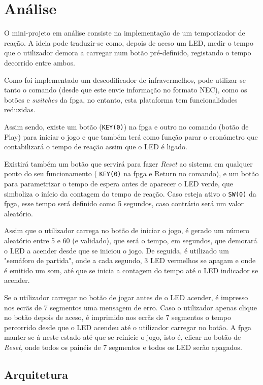 \documentclass[a4paper,11pt,onecolumn]{report}
\begin{document}
\chapter{Análise}
\label{chap.analise}
O mini-projeto em análise consiste na implementação de um temporizador de reação. A ideia pode traduzir-se como, depois de aceso um LED, medir o tempo que o utilizador demora a carregar num botão pré-definido, registando o tempo decorrido entre ambos. 

Como foi implementado um descodificador de infravermelhos, pode utilizar-se tanto o comando (desde que este envie informação no formato NEC), como os botões e \textit{switches} da \ac{fpga}, no entanto, esta plataforma tem funcionalidades reduzidas.

Assim sendo, existe um botão (\texttt{KEY(0)}) na \ac{fpga} e outro no comando (botão de Play) para iniciar o jogo e que também terá como função parar o cronómetro que contabilizará o tempo de reação assim que o LED é ligado.

Existirá também um botão que servirá para fazer \textit{Reset} ao sistema em qualquer ponto do seu funcionamento ( \texttt{KEY(0)} na \ac{fpga} e Return no comando), e um botão para parametrizar o tempo de espera antes de aparecer o LED verde, que simboliza o início da contagem do tempo de reação. Caso esteja ativo o \texttt{SW(0)} da \ac{fpga}, esse tempo será definido como 5 segundos, caso contrário será um valor aleatório.

Assim que o utilizador carrega no botão de iniciar o jogo, é gerado um número aleatório entre 5 e 60 (e validado), que será o tempo, em segundos, que demorará o LED a acender desde que se iniciou o jogo. De seguida, é utilizado um "semáforo de partida", onde a cada segundo, 3 LED vermelhos se apagam e onde é emitido um som, até que se inicia a contagem do tempo até o LED indicador se acender.

Se o utilizador carregar no botão de jogar antes de o LED acender, é impresso nos ecrãs de 7 segmentos uma mensagem de erro. Caso o utilizador apenas clique no botão depois de aceso, é imprimido nos ecrãs de 7 segmentos o tempo percorrido desde que o LED acendeu até o utilizador carregar no botão. A \ac{fpga} manter-se-á neste estado até que se reinicie o jogo, isto é, clicar no botão de \textit{Reset}, onde todos os painéis de 7 segmentos e todos os LED serão apagados.

\section{Arquitetura}
\end{document}
